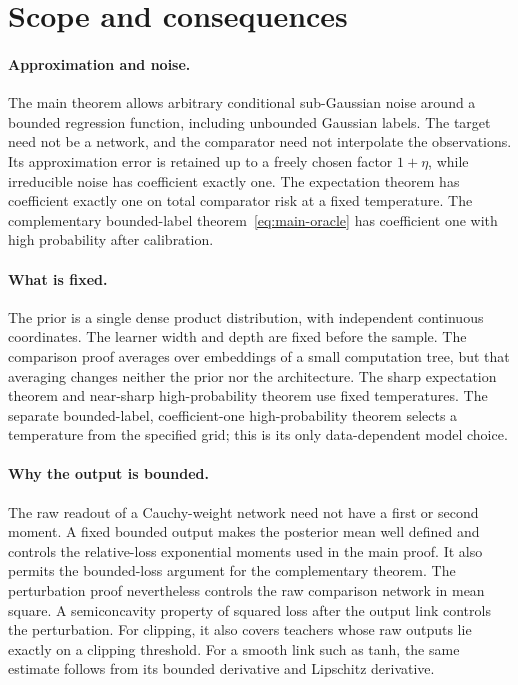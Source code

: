 \documentclass[11pt]{article}
\theoremstyle{remark}\newtheorem{remark}[theorem]{Remark}
\begin{document}








\section{Scope and consequences}\label{sec:biases}
\paragraph{Approximation and noise.}
The main theorem allows arbitrary conditional sub-Gaussian noise around a bounded regression function, including unbounded Gaussian labels. The target need not be a network, and the comparator need not interpolate the observations. Its approximation error is retained up to a freely chosen factor $1+\eta$, while irreducible noise has coefficient exactly one. The expectation theorem has coefficient exactly one on total comparator risk at a fixed temperature. The complementary bounded-label theorem~\eqref{eq:main-oracle} has coefficient one with high probability after calibration.

\paragraph{What is fixed.}
The prior is a single dense product distribution, with independent continuous coordinates. The learner width and depth are fixed before the sample. The comparison proof averages over embeddings of a small computation tree, but that averaging changes neither the prior nor the architecture. The sharp expectation theorem and near-sharp high-probability theorem use fixed temperatures. The separate bounded-label, coefficient-one high-probability theorem selects a temperature from the specified grid; this is its only data-dependent model choice.

\paragraph{Why the output is bounded.}
The raw readout of a Cauchy-weight network need not have a first or second moment. A fixed bounded output makes the posterior mean well defined and controls the relative-loss exponential moments used in the main proof. It also permits the bounded-loss argument for the complementary theorem. The perturbation proof nevertheless controls the raw comparison network in mean square. A semiconcavity property of squared loss after the output link controls the perturbation. For clipping, it also covers teachers whose raw outputs lie exactly on a clipping threshold. For a smooth link such as tanh, the same estimate follows from its bounded derivative and Lipschitz derivative.
\end{document}
